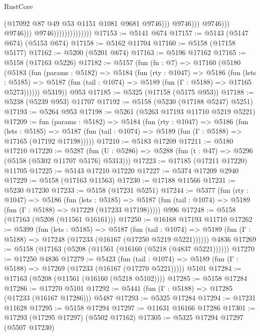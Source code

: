 \begin{lexlean}{RustCore}
\begin{coremodule}
                                                      (@17092 @87 @49 @53 @1151 @1081 @9681 @9746)))
                                                  @9746)))
                                            @9746)))
                                      @9746)))
                                @9746))))))))))))))
@17153 := @5141 @674
@17157 := @5143 (@5147 @674) (@5153 @674)
@17158 := @5162 @11704
@17160 := @5158 (@17158 @5177)
@17162 := @5200 (@5201 @674)
@17163 := @5196 @17162
@17165 := @5158 (@17163 @5226)
@17182 := @5157
    (fun (fn : @7) =>
    @17160
      (@5180
        (@5183
          (fun (params : @5182) =>
          @5184
            (fun (rty : @1047) =>
            @5186
              (fun (lets : @5185) =>
              @5187 (fun (tail : @1074) => @5189 (fun (Γ : @5188) => @17165 @5273))))))
        @5319))
    @953
@17185 := @5325 (@17158 (@5175 @953))
@17188 := @5238 (@5239 @953) @11707
@17192 := @5158 (@5230 (@17188 @5247) @5251)
@17193 := @5264 @953
@17198 := @5261 (@5263 @17193 @11710 @5219 @5221)
@17209 := fun (params : @5182) =>
  @5184
    (fun (rty : @1047) =>
    @5186
      (fun (lets : @5185) =>
      @5187 (fun (tail : @1074) => @5189 (fun (Γ : @5188) => @17165 (@17192 @17198)))))
@17210 := @5183 @17209
@17211 := @5180 @17210
@17220 := @5287
    (fun (U : @5286) => @5288 (fun (t : @47) => @5296 (@5158 (@5302 @11707 @5176) @5313)))
@17223 := @17185 (@17211 @17220) @11705
@17225 := @5143 @17210 @17220
@17227 := @5374 @17209 @2940
@17229 := @5158 (@17163 @11563)
@17230 := @17188 @11566
@17231 := @5230 @17230
@17233 := @5158 (@17231 @5251)
@17244 := @5377
    (fun (rty : @1047) =>
    @5186
      (fun (lets : @5185) =>
      @5187 (fun (tail : @1074) => @5189 (fun (Γ : @5188) => @17229 (@17233 @17198)))))
    @996
@17248 := @5158 (@17163 (@5208 (@11561 @16161)))
@17250 := @16168 @17193 @11710
@17262 := @5399
    (fun (lets : @5185) =>
    @5187
      (fun (tail : @1074) =>
      @5189 (fun (Γ : @5188) => @17248 (@17233 (@16167 (@17250 @5219 @5221))))))
    @4836
@17269 := @5158 (@17163 (@5208 (@11561 (@16160 (@5218 (@4837 @5221))))))
@17270 := @17250 @4836
@17279 := @5423
    (fun (tail : @1074) => @5189 (fun (Γ : @5188) => @17269 (@17233 (@16167 (@17270 @5221)))))
    @5101
@17284 := @17163 (@5208 (@11561 (@16160 (@5218 @5102))))
@17285 := @5158 @17284
@17286 := @17270 @5101
@17292 := @5441 (fun (Γ : @5188) => @17285 (@17233 (@16167 @17286))) @5487
@17293 := @5325 @17284
@17294 := @17231 @11628
@17295 := @5158 @17294
@17297 := @11631 @16166 @17286
@17301 := @17293 (@17295 @17297) (@5502 @17162)
@17305 := @5325 @17294 @17297 (@5507 @17230)

\end{coremodule}
\end{lexlean}
